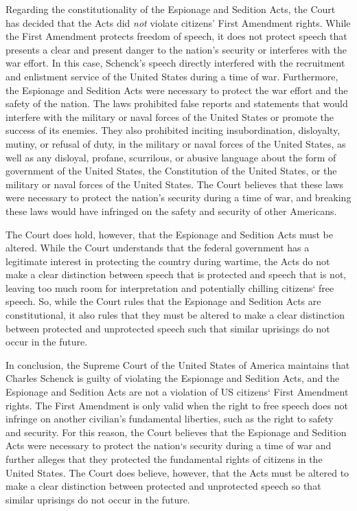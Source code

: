 \documentclass[a4paper, 12pt]{article}
\begin{document}
\hspace{\parindent} Regarding the constitutionality of the Espionage and Sedition Acts, the Court has decided that the Acts did \emph{not} violate citizens' First Amendment rights. While the First Amendment protects freedom of speech, it does not protect speech that presents a clear and present danger to the nation's security or interferes with the war effort. In this case, Schenck's speech directly interfered with the recruitment and enlistment service of the United States during a time of war. Furthermore, the Espionage and Sedition Acts were necessary to protect the war effort and the safety of the nation. The laws prohibited false reports and statements that would interfere with the military or naval forces of the United States or promote the success of its enemies. They also prohibited inciting insubordination, disloyalty, mutiny, or refusal of duty, in the military or naval forces of the United States, as well as any disloyal, profane, scurrilous, or abusive language about the form of government of the United States, the Constitution of the United States, or the military or naval forces of the United States. The Court believes that these laws were necessary to protect the nation's security during a time of war, and breaking these laws would have infringed on the safety and security of other Americans.

\hspace{\parindent} The Court does hold, however, that the Espionage and Sedition Acts must be altered. While the Court understands that the federal government has a legitimate interest in protecting the country during wartime, the Acts do not make a clear distinction between speech that is protected and speech that is not, leaving too much room for interpretation and potentially chilling citizens` free speech. So, while the Court rules that the Espionage and Sedition Acts are constitutional, it also rules that they must be altered to make a clear distinction between protected and unprotected speech such that similar uprisings do not occur in the future.

\hspace{\parindent} In conclusion, the Supreme Court of the United States of America maintains that Charles Schenck is guilty of violating the Espionage and Sedition Acts, and the Espionage and Sedition Acts are not a violation of US citizens` First Amendment rights. The First Amendment is only valid when the right to free speech does not infringe on another civilian's fundamental liberties, such as the right to safety and security. For this reason, the Court believes that the Espionage and Sedition Acts were necessary to protect the nation`s security during a time of war and further alleges that they protected the fundamental rights of citizens in the United States. The Court does believe, however, that the Acts must be altered to make a clear distinction between protected and unprotected speech so that similar uprisings do not occur in the future.
\end{document}
